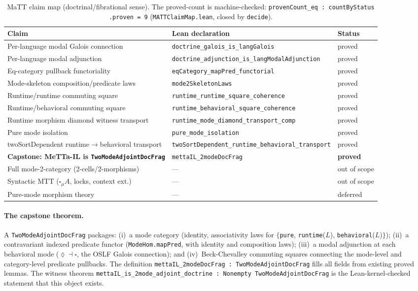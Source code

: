 \documentclass[11pt]{article}
\newcommand{\code}[1]{\texttt{#1}}
\begin{document}
\begin{table}[h]
\centering
\begin{tabular}{lll}
\toprule
Claim & Lean declaration & Status \\
\midrule
Per-language modal Galois connection &
  \code{doctrine\_galois\_is\_langGalois} & proved \\
Per-language modal adjunction &
  \code{doctrine\_adjunction\_is\_langModalAdjunction} & proved \\
Eq-category pullback functoriality &
  \code{eqCategory\_mapPred\_functorial} & proved \\
Mode-skeleton composition/predicate laws &
  \code{mode2SkeletonLaws} & proved \\
Runtime/runtime commuting square &
  \code{runtime\_runtime\_square\_coherence} & proved \\
Runtime/behavioral commuting square &
  \code{runtime\_behavioral\_square\_coherence} & proved \\
Runtime morphism diamond witness transport &
  \code{runtime\_mode\_diamond\_transport\_comp} & proved \\
Pure mode isolation &
  \code{pure\_mode\_isolation} & proved \\
twoSortDependent runtime$\to$behavioral transport &
  \code{twoSortDependent\_runtime\_behavioral\_transport} & proved \\
\textbf{Capstone: MeTTa-IL is \code{TwoModeAdjointDocFrag}} &
  \code{mettaIL\_2modeDocFrag} & \textbf{proved} \\
\midrule
Full mode-2-category (2-cells/2-morphisms) & --- & out of scope \\
Syntactic MTT ($\square_\mu A$, locks, context ext.) & --- & out of scope \\
Pure-mode morphism theory & --- & deferred \\
\bottomrule
\end{tabular}
\caption{MaTT claim map (doctrinal/fibrational sense).  The proved-count is
  machine-checked: \code{provenCount\_eq : countByStatus .proven = 9}
  (\texttt{MATTClaimMap.lean}, closed by \code{decide}).}
\label{tab:matt}
\end{table}

\paragraph{The capstone theorem.}
A \code{TwoModeAdjointDocFrag} packages:
(i)~a mode category (identity, associativity laws for $\{$\texttt{pure},
\texttt{runtime}($L$), \texttt{behavioral}($L$)$\}$);
(ii)~a contravariant indexed predicate functor (\code{ModeHom.mapPred},
with identity and composition laws);
(iii)~a modal adjunction at each behavioral mode ($\lozenge \dashv \square$,
the OSLF Galois connection); and
(iv)~Beck-Chevalley commuting squares connecting the mode-level and
category-level predicate pullbacks.
The definition \code{mettaIL\_2modeDocFrag : TwoModeAdjointDocFrag}
fills all fields from existing proved lemmas.
The witness theorem \code{mettaIL\_is\_2mode\_adjoint\_doctrine :
Nonempty TwoModeAdjointDocFrag} is the Lean-kernel-checked statement
that this object exists.
\end{document}
